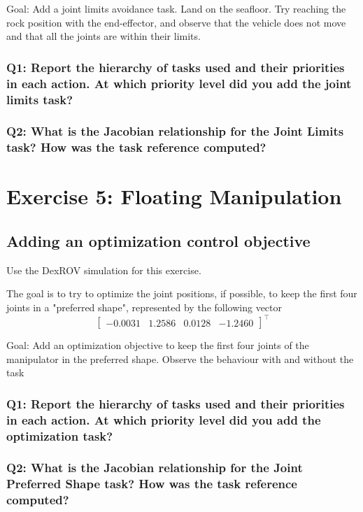 \documentclass{article}
\begin{document}
Goal: Add a joint limits avoidance task. Land on the seafloor. Try reaching the rock position with the end-effector, and observe that the vehicle does not move and that all the joints are within their limits.

\subsubsection{Q1: Report the hierarchy of tasks used and their priorities in each action. At which priority level did you add the joint limits task?}

\subsubsection{Q2: What is the Jacobian relationship for the Joint Limits task? How was the task reference computed?}

\clearpage
\section{Exercise 5: Floating Manipulation}
\subsection{Adding an optimization control objective}
Use the DexROV simulation for this exercise. 

The goal is to try to optimize the joint positions, if possible, to keep the first four joints in a "preferred shape", represented by the following vector
\begin{displaymath}
\begin{bmatrix}-0.0031 & 1.2586 & 0.0128 & -1.2460 \end{bmatrix}^\top
\end{displaymath}

Goal: Add an optimization objective to keep the first four joints of the manipulator in the preferred shape. Observe the behaviour with and without the task

\subsubsection{Q1: Report the hierarchy of tasks used and their priorities in each action. At which priority level did you add the optimization task?}

\subsubsection{Q2: What is the Jacobian relationship for the Joint Preferred Shape task? How was the task reference computed?}
\end{document}
